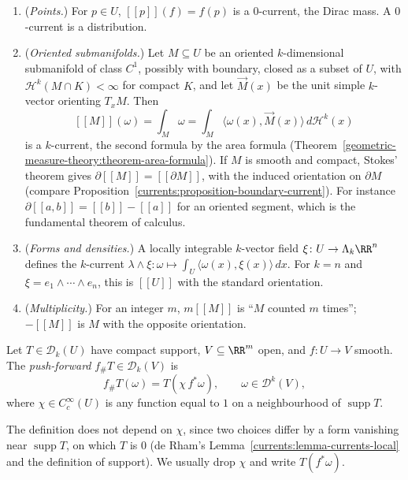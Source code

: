 \begin{example}\label{currents:example-currents}
\begin{enumerate}
\item (\emph{Points.}) For $p \in U$, $[\![p]\!](f) = f(p)$ is a $0$-current, the Dirac mass. A $0$-current is a distribution.
\item (\emph{Oriented submanifolds.}) Let $M \subseteq U$ be an oriented $k$-dimensional submanifold of class $C^1$, possibly with boundary, closed as a subset of $U$, with $\mathcal{H}^k(M \cap K) < \infty$ for
compact $K$, and let $\vec{M}(x)$ be the unit simple $k$-vector orienting $T_xM$. Then
\[
[\![M]\!](\omega) = \int_M\omega = \int_M\langle\omega(x), \vec{M}(x)\rangle\,d\mathcal{H}^k(x)
\]
is a $k$-current, the second formula by the area formula (Theorem~\ref{geometric-measure-theory:theorem-area-formula}). If $M$ is smooth and compact, Stokes' theorem gives $\partial[\![M]\!] = [\![\partial M]\!]$,
with the induced orientation on $\partial M$ (compare Proposition~\ref{currents:proposition-boundary-current}). For instance $\partial[\![a, b]\!] = [\![b]\!] - [\![a]\!]$ for an oriented segment, which is the
fundamental theorem of calculus.
\item (\emph{Forms and densities.}) A locally integrable $k$-vector field $\xi \colon U \to \Lambda_k\RR^n$ defines the $k$-current $\lambda \wedge \xi \colon \omega \mapsto \int_U\langle\omega(x), \xi(x)\rangle\,dx$. For
$k = n$ and $\xi = e_1 \wedge \cdots \wedge e_n$, this is $[\![U]\!]$ with the standard orientation.
\item (\emph{Multiplicity.}) For an integer $m$, $m[\![M]\!]$ is ``$M$ counted $m$ times''; $-[\![M]\!]$ is $M$ with the opposite orientation.
\end{enumerate}
\end{example}

\begin{definition}\label{currents:definition-push-forward}
Let $T \in \mathcal{D}_k(U)$ have compact support, $V \subseteq \RR^m$ open, and $f \colon U \to V$ smooth. The \emph{push-forward} $f_\#T \in \mathcal{D}_k(V)$ is
\[
f_\#T(\omega) = T(\chi\,f^*\omega), \qquad \omega \in \mathcal{D}^k(V),
\]
where $\chi \in C^\infty_c(U)$ is any function equal to $1$ on a neighbourhood of $\operatorname{supp}T$.
\end{definition}

The definition does not depend on $\chi$, since two choices differ by a form vanishing near $\operatorname{supp}T$, on which $T$ is $0$ (de Rham's Lemma~\ref{currents:lemma-currents-local} and the
definition of support). We usually drop $\chi$ and write $T(f^*\omega)$.

